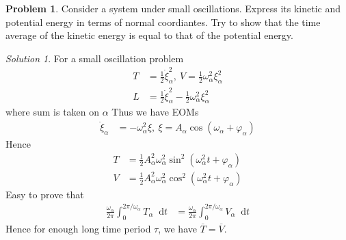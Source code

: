 \documentclass[twoside,11pt]{article}
\newcommand{\lms}{\fontfamily{lmss}\selectfont} %
\renewcommand*\d{\mathop{}\!\mathrm{d}}
\theoremstyle{definition}
\newtheorem{problem}{\lms Problem}
\theoremstyle{remark}
\newtheorem*{solution}{Solution}
\begin{document}
\begin{problem}
Consider a system under small oscillations.
Express its kinetic and potential energy in terms of normal coordiantes.
Try to show that the time average of the kinetic energy is equal to that of the 
potential energy.
\end{problem}
\begin{solution}
For a small oscillation problem
\begin{align*}
    T &= \frac{1}{2}\dot\xi_\alpha^2,~
    V  = \frac{1}{2}\omega_\alpha^2\xi_\alpha^2\\
    L &= \frac{1}{2}\dot\xi_\alpha^2 - \frac{1}{2}\omega_\alpha^2\xi_\alpha^2
\end{align*}
where sum is taken on $\alpha$
Thus we have EOMs
\begin{align*}
    \ddot\xi_\alpha &= -\omega_\alpha^2\xi,~
    \xi = A_\alpha\cos(\omega_\alpha + \varphi_\alpha)
\end{align*}
Hence
\begin{align*}
    T &= \frac{1}{2}A_\alpha^2\omega_\alpha^2\sin^2(\omega_\alpha^2 t + \varphi_\alpha)\\
    V &= \frac{1}{2}A_\alpha^2\omega_\alpha^2\cos^2(\omega_\alpha^2 t + \varphi_\alpha)
\end{align*}
Easy to prove that
\begin{align*}
    \frac{\omega_\alpha}{2\pi}\int_0^{2\pi/\omega_\alpha}
    T_\alpha\d t &= 
    \frac{\omega_\alpha}{2\pi}\int_0^{2\pi/\omega_\alpha}
    V_\alpha\d t
\end{align*}
Hence for enough long time period $\tau$, we have $\overline{T}=\overline{V}$.
\end{solution}
\end{document}
